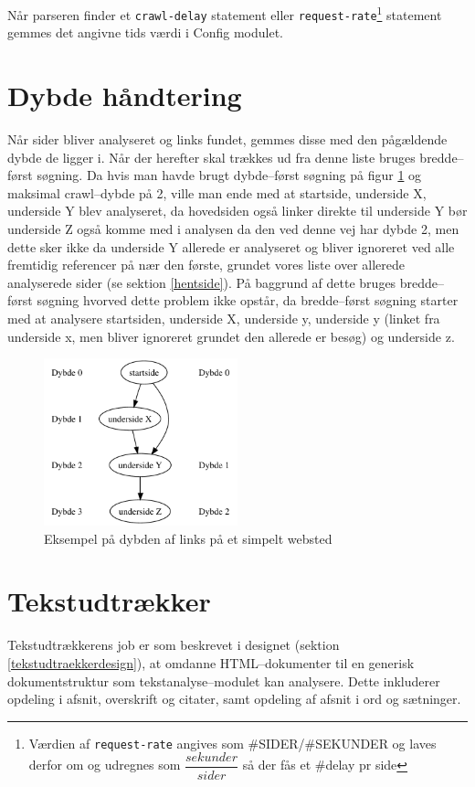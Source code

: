 \documentclass[a4paper,oneside]{memoir}
\begin{document}
Når parseren finder et \texttt{crawl-delay} statement eller 
\texttt{request-rate}\footnote{Værdien af \texttt{request-rate}
angives som \#SIDER/\#SEKUNDER og laves derfor om og udregnes som
$\dfrac{sekunder}{sider}$ så der fås et \#delay pr side} statement
gemmes det angivne tids værdi i Config modulet.

\section{Dybde håndtering}

Når sider bliver analyseret og links fundet, gemmes disse med den
pågældende dybde de ligger i. Når der herefter skal trækkes ud fra
denne liste bruges bredde--først søgning. Da hvis man havde brugt
dybde--først søgning på figur \ref{depthtree} og maksimal crawl--dybde
på 2, ville man ende med at startside, underside X, underside Y blev
analyseret, da hovedsiden også linker direkte til underside Y bør
underside Z også komme med i analysen da den ved denne vej har dybde
2, men dette sker ikke da underside Y allerede er analyseret og bliver
ignoreret ved alle fremtidig referencer på nær den første, grundet
vores liste over allerede analyserede sider (se sektion \ref{hentside}).
På baggrund af dette bruges bredde--først søgning hvorved dette problem
ikke opstår, da bredde--først søgning starter med at analysere startsiden,
underside X, underside y, underside y (linket fra underside x, men bliver
ignoreret grundet den allerede er besøg) og underside z.

\begin{figure}[h]
  \centering
  \includegraphics[width=0.5\textwidth]{depthtreeill.pdf}
  \caption{Eksempel på dybden af links på et simpelt websted}
  \label{depthtree}
\end{figure}

\section{Tekstudtrækker}
Tekstudtrækkerens job er som beskrevet i designet (sektion
\ref{tekstudtraekkerdesign}), at omdanne HTML--dokumenter til en
generisk dokumentstruktur som tekstanalyse--modulet kan
analysere. Dette inkluderer opdeling i afsnit, overskrift og citater,
samt opdeling af afsnit i ord og sætninger.
\end{document}
